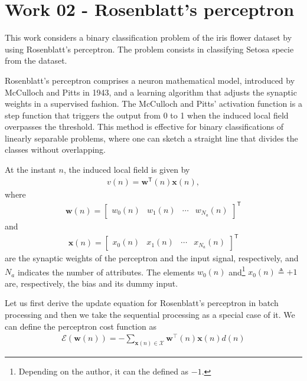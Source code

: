 \documentclass[12pt,a4paper]{article}
\newcommand{\trans}{\mathsf{T}}
\begin{document}

\section{Work 02 - Rosenblatt's perceptron}

This work considers a binary classification problem of the iris flower dataset by using Rosenblatt's perceptron. The problem consists in classifying Setosa specie from the dataset.

Rosenblatt's perceptron comprises a neuron mathematical model, introduced by McCulloch and Pitts in 1943, and a learning algorithm that adjusts the synaptic weights in a supervised fashion. The McCulloch and Pitts' activation function is a step function that triggers the output from 0 to 1 when the induced local field overpasses the threshold. This method is effective for binary classifications of linearly separable problems, where one can sketch a straight line that divides the classes without overlapping.

At the instant \(n\), the induced local field is given by
\begin{align}
    v(n) = \mathbf{w}^\trans\left(n\right) \mathbf{x}\left(n\right),
    \label{eq:induced-local-field}
\end{align}
where
\begin{align}
    \mathbf{w}\left(n\right) = \begin{bmatrix}
        w_0(n) & w_1(n) & \cdots & w_{N_a}(n)
    \end{bmatrix}^\trans
\end{align}
and
\begin{align}
    \mathbf{x}\left(n\right) = \begin{bmatrix}
        x_0(n) & x_1(n) & \cdots & x_{N_a}(n)
    \end{bmatrix}^\trans
\end{align}
are the synaptic weights of the perceptron and the input signal, respectively, and \(N_a\) indicates the number of attributes. The elements \(w_0(n)\) and\footnote{Depending on the author, it can the defined as \(-1\).} \(x_0(n) \triangleq +1\) are, respectively, the bias and its dummy input.

Let us first derive the update equation for Rosenblatt's perceptron in batch processing and then we take the sequential processing as a special case of it. We can define the perceptron cost function as
\begin{align}
    \mathscr{E}\left( \mathbf{w} \left( n \right) \right) = - \sum_{\mathbf{x}(n) \in \mathscr{X}} \mathbf{w}^\top(n) \mathbf{x}(n) d(n)
\end{align}
\end{document}
